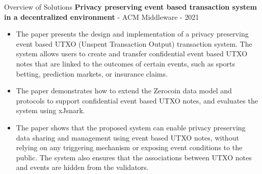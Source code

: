 \documentclass[10pt,aspectratio=169]{beamer}
\begin{document}
\begin{frame}{Overview of Solutions}
\textbf {Privacy preserving event based transaction system in a decentralized environment} - {ACM Middleware} - {2021}
\begin{itemize} \item The paper presents the design and implementation of a privacy preserving event based UTXO (Unspent Transaction Output) transaction system. The system allows users to create and transfer confidential event based UTXO notes that are linked to the outcomes of certain events, such as sports betting, prediction markets, or insurance claims. \item The paper demonstrates how to extend the Zerocoin data model and protocols to support confidential event based UTXO notes, and evaluates the system using xJsnark. \item The paper shows that the proposed system can enable privacy preserving data sharing and management using event based UTXO notes, without relying on any triggering mechanism or exposing event conditions to the public. The system also ensures that the associations between UTXO notes and events are hidden from the validators. \end{itemize}
\end{frame}
\end{document}

